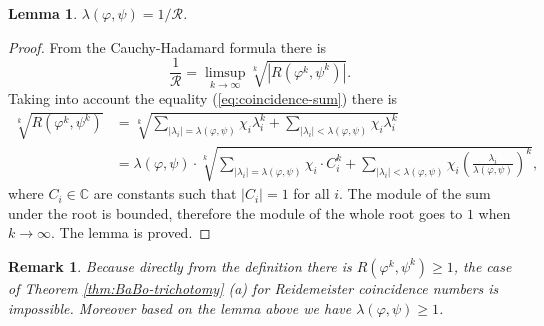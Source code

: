 \documentclass[12pt, a4paper]{amsart}
\def\C{{\mathbb C}}
\newtheorem{lemma}[theorem]{Lemma}
\newtheorem{remark}[theorem]{Remark}
\begin{document}
\begin{lemma}\label{thm:lambda-inverse-reidemeister}
  $\lambda(\varphi, \psi) = 1 / \mathcal{R}$.
\end{lemma}
\begin{proof}
  From the Cauchy-Hadamard formula there is
  \[
    \frac{1}{\mathcal{R}} = \limsup_{k \to \infty} \sqrt[k]{|R(\varphi^k, \psi^k)|}.
  \]
  Taking into account the equality (\ref{eq:coincidence-sum}) there is
  \begin{align*}
    \sqrt[k]{R(\varphi^k, \psi^k)} &= \sqrt[k]{\sum_{|\lambda_i| = \lambda(\varphi, \psi)} \chi_i \lambda_i^k
        + \sum_{|\lambda_i| < \lambda(\varphi, \psi)} \chi_i \lambda_i^k } \\
     &= \lambda(\varphi, \psi) \cdot \sqrt[k]{\sum_{|\lambda_i| = \lambda(\varphi, \psi)} \chi_i \cdot C_i^k
         + \sum_{|\lambda_i| < \lambda(\varphi, \psi)} \chi_i \left( \frac{\lambda_i}{\lambda(\varphi, \psi)} \right)^k },
  \end{align*}
  where $C_i \in \C$ are constants such that $|C_i| = 1$ for all $i$.
  The module of the sum under the root is bounded,
  therefore the module of the whole root goes to $1$ when $k \to \infty$.
  The lemma is proved.
\end{proof}

\begin{remark}
  Because directly from the definition there is $R(\varphi^k, \psi^k) \geq 1$,
  the case of Theorem \ref{thm:BaBo-trichotomy} (a) for Reidemeister coincidence numbers is impossible.
  Moreover based on the lemma above we have $\lambda(\varphi, \psi) \geq 1$.
\end{remark}
\end{document}
